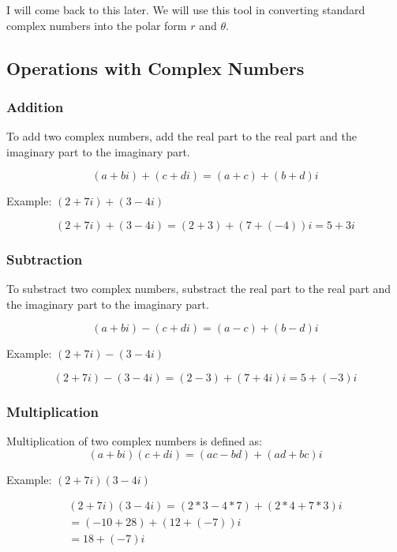 I will come back to this later. We will use this tool in converting standard complex numbers into the polar form $r$ and $\theta$.


\subsection{Operations with Complex Numbers}

\subsubsection{Addition}

To add two complex numbers, add the real part to the real part and the imaginary part to the imaginary part.

\begin{equation}
    (a+bi)+(c+di)=(a+c)+(b+d)i
\end{equation}

Example: $(2+7i)+(3-4i)$

\begin{equation}
    (2+7i)+(3-4i)=(2+3)+(7+(-4))i
    =5+3i
\end{equation}

\subsubsection{Subtraction}
To substract two complex numbers, substract the real part to the real part and the imaginary part to the imaginary part.

\begin{equation}
    (a+bi)-(c+di)=(a-c)+(b-d)i     
\end{equation}

Example: $(2+7i)-(3-4i)$

\begin{equation}
    (2+7i)-(3-4i)=(2-3)+(7+4i)i
    =5+(-3)i
\end{equation}

\subsubsection{Multiplication}
Multiplication of two complex numbers is defined as:
\begin{equation}
    (a+bi)(c+di)=(ac-bd)+(ad+bc)i
\end{equation}

Example: $(2+7i)(3-4i)$

\begin{equation}
    \begin{split}        
(2+7i)(3-4i)=(2*3-4*7)+(2*4+7*3)i\\
=(-10+28)+(12+(-7))i \\
=18+(-7)i            
    \end{split}
\end{equation}

